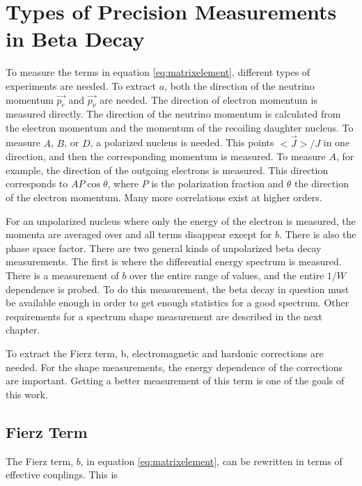 \documentclass[../MaxHughesThesis.tex]{subfiles}
\begin{document}
\section{Types of Precision Measurements in Beta Decay}
To measure the terms in equation \ref{eq:matrixelement}, different types of experiments are needed.
To extract $a$, both the direction of the neutrino momentum $\vec{p_{e}}$ and $\vec{p_{\nu}}$ are needed.  
The direction of electron momentum is measured directly. 
The direction of the neutrino momentum is calculated from the electron momentum and the momentum of the recoiling daughter nucleus. 
To measure $A$, $B$, or $D$, a polarized nucleus is needed.
This points $<\vec{J}>/J$ in one direction, and then the corresponding momentum is measured.
To measure $A$, for example, the direction of the outgoing electrons is measured.
This direction corresponds to $AP\cos{\theta}$, where $P$ is the polarization fraction and $\theta$ the direction of the electron momentum.
Many more correlations exist at higher orders.

For an unpolarized nucleus where only the energy of the electron is measured, the momenta are averaged over and all terms disappear except for $b$.
There is also the phase space factor.
There are two general kinds of unpolarized beta decay measurements.
The first is where the differential energy spectrum is measured.
There is a measurement of $b$ over the entire range of values, and the entire $1/W$ dependence is probed.
To do this measurement, the beta decay in question must be available enough in order to get enough statistics for a good spectrum.
Other requirements for a spectrum shape measurement are described in the next chapter.

To extract the Fierz term, b, electromagnetic and hardonic corrections are needed.
For the shape measurements, the energy dependence of the corrections are important.
Getting a better measurement of this term is one of the goals of this work.

\subsection{Fierz Term}
The Fierz term, $b$, in equation \ref{eq:matrixelement}, can be rewritten in terms of effective couplings.
This is %
\end{document}
